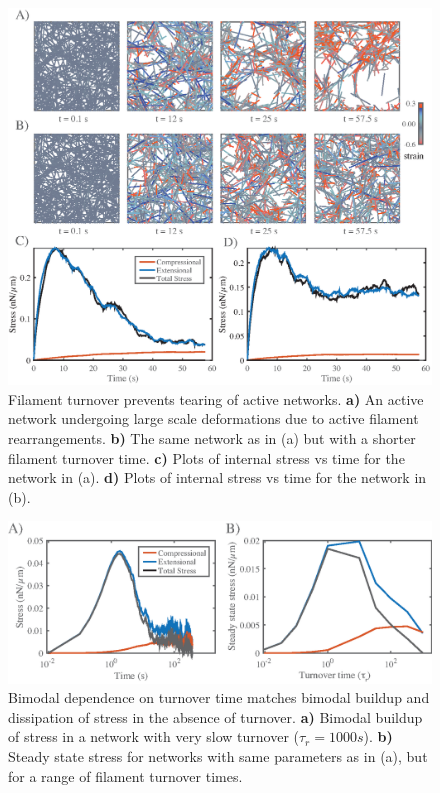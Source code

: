 \begin{figure}[H]
	\centering
	\includegraphics[width=\hsize]{active/figures/FigS4}
	\caption{\label{fig:active_tear}  Filament turnover prevents tearing of active networks.  \textbf{a)}  An active network undergoing large scale deformations due to active filament rearrangements.  \textbf{b)}  The same network as in (a) but with a shorter filament turnover time.  \textbf{c)}  Plots of internal stress vs time for the network in (a).  \textbf{d)}  Plots of internal stress vs time for the network in (b).  }
\end{figure}

\begin{figure}[H]
	\centering
	\includegraphics[width=\hsize]{active/figures/FigS5}
	\caption{\label{fig:recycle_supp}  Bimodal dependence on turnover time matches bimodal buildup and dissipation of stress in the absence of turnover.  \textbf{a)}  Bimodal buildup of stress in a network with very slow turnover ($\tau_r = 1000s$).  \textbf{b)}  Steady state stress for networks with same parameters as in (a), but  for a range of filament turnover times.   }
\end{figure}

